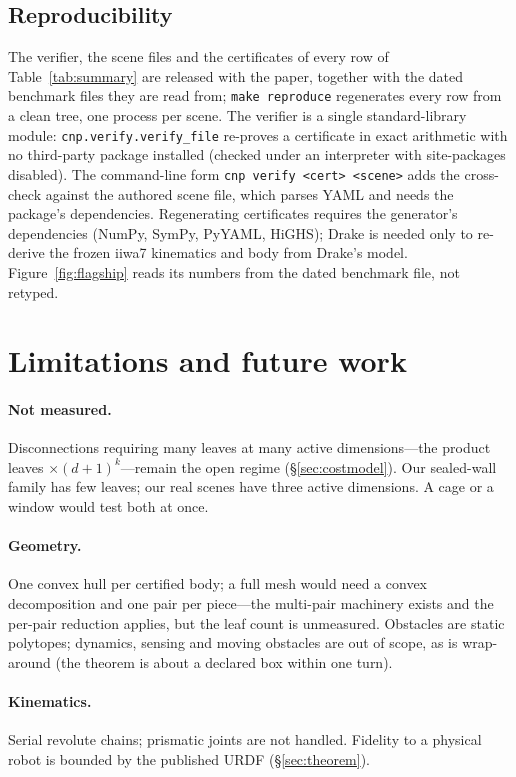 \documentclass[10pt,twocolumn,letterpaper]{article}
\begin{document}
\subsection{Reproducibility}
The verifier, the scene files and the certificates of every row of Table~\ref{tab:summary} are released with the paper, together with the dated benchmark files they are read from; \texttt{make reproduce} regenerates every row from a clean tree, one process per scene. The verifier is a single standard-library module: \texttt{cnp.verify.verify\_file} re-proves a certificate in exact arithmetic with no third-party package installed (checked under an interpreter with site-packages disabled). The command-line form \texttt{cnp verify <cert> <scene>} adds the cross-check against the authored scene file, which parses YAML and needs the package's dependencies. Regenerating certificates requires the generator's dependencies (NumPy, SymPy, PyYAML, HiGHS); Drake is needed only to re-derive the frozen iiwa7 kinematics and body from Drake's model. Figure~\ref{fig:flagship} reads its numbers from the dated benchmark file, not retyped.

\section{Limitations and future work}\label{sec:limitations}

\paragraph{Not measured.} Disconnections requiring many leaves at many active dimensions---the product leaves $\times(d+1)^k$---remain the open regime (\S\ref{sec:costmodel}). Our sealed-wall family has few leaves; our real scenes have three active dimensions. A cage or a window would test both at once.

\paragraph{Geometry.} One convex hull per certified body; a full mesh would need a convex decomposition and one pair per piece---the multi-pair machinery exists and the per-pair reduction applies, but the leaf count is unmeasured. Obstacles are static polytopes; dynamics, sensing and moving obstacles are out of scope, as is wrap-around (the theorem is about a declared box within one turn).

\paragraph{Kinematics.} Serial revolute chains; prismatic joints are not handled. Fidelity to a physical robot is bounded by the published URDF (\S\ref{sec:theorem}).
\end{document}
